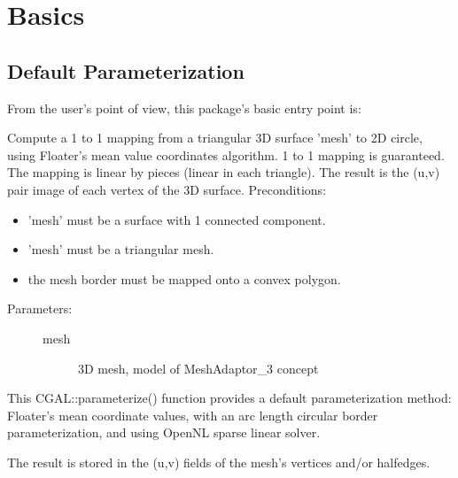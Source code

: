 \section{Basics}


\subsection{Default Parameterization}

From the user's point of view, this package's basic entry point is:

{
Compute a 1 to 1 mapping from a triangular 3D surface 'mesh' to 2D circle, using
Floater's mean value coordinates algorithm. 1 to 1 mapping is guaranteed.
The mapping is linear by pieces (linear in each triangle). The result is the (u,v) pair image of each vertex of the 3D surface.
Preconditions:\begin{itemize}
\item 'mesh' must be a surface with 1 connected component.\item 'mesh' must be a triangular mesh.\item the mesh border must be mapped onto a convex polygon.\end{itemize}
}
\begin{description}
\item[Parameters: ]
\begin{description}
\item[mesh]3D mesh, model of MeshAdaptor\_3 concept \end{description}
\end{description}

This CGAL::parameterize() function provides a default parameterization method: Floater's
mean coordinate values, with an arc length circular border parameterization, and using
OpenNL sparse linear solver.

The result is stored in the (u,v) fields of the mesh's vertices and/or halfedges.


